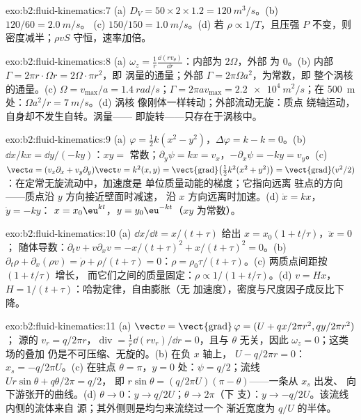 \begin{solution}{exo:b2:fluid-kinematics:7}
(a) $D_V = 50 \times 2 \times 1.2 = \qty{120}{m^3/s}$。(b) $120/60 = \qty{2.0}{m/s}$。
(c) $150/150 = \qty{1.0}{m/s}$。(d) 若 $\rho \propto 1/T$，且压强 $P$ 不变，则
密度减半；$\rho vS$ 守恒，速率加倍。
\end{solution}

\begin{solution}{exo:b2:fluid-kinematics:8}
(a) $\omega_z = \frac1r\frac{\dd(rv_\theta)}{\dd r}$：内部为 $2\Omega$，外部
为 $0$。(b) 内部 $\Gamma = 2\pi r\cdot\Omega r = 2\Omega\cdot\pi r^2$，即
涡量的通量；外部 $\Gamma = 2\pi\Omega a^2$，为常数，即
整个涡核的通量。(c) $\Omega = v_{\max}/a = \qty{1.4}{rad/s}$；$\Gamma = 2\pi av_{\max}
= \qty{2.2e4}{m^2/s}$；在 \qty{500}{m} 处：$\Omega a^2/r = \qty{7}{m/s}$。(d) 涡核
像刚体一样转动；外部流动无旋：质点
绕轴运动，自身却不发生自转。涡量——
即旋转——只存在于涡核中。
\end{solution}

\begin{solution}{exo:b2:fluid-kinematics:9}
(a) $\varphi = \tfrac12k(x^2 - y^2)$，$\Delta\varphi = k - k = 0$。(b) $\dd x/
kx = \dd y/(-ky)$：$xy = $ 常数；$\partial_y\psi = kx = v_x$，$-\partial_x\psi =
-ky = v_y$。(c) $\vect a = (v_x\partial_x + v_y\partial_y)\vect v = k^2(x, y) =
\operatorname{\vect{grad}}\bigl(\tfrac12k^2(x^2 + y^2)\bigr) = \operatorname{\vect{grad}}
(v^2/2)$：在定常无旋流动中，加速度是
单位质量动能的梯度；它指向远离
驻点的方向——质点沿 $y$ 方向接近壁面时减速，
沿 $x$ 方向远离时加速。(d) $\dot x = kx$，$\dot y = -ky$：
$x = x_0\eu^{kt}$，$y = y_0\eu^{-kt}$（$xy$ 为常数）。
\end{solution}

\begin{solution}{exo:b2:fluid-kinematics:10}
(a) $\dd x/\dd t = x/(t + \tau)$ 给出 $x = x_0(1 + t/\tau)$，$\ddot x = 0$；
随体导数：$\partial_tv + v\partial_xv = -x/(t + \tau)^2 + x/(t + \tau)^2
= 0$。(b) $\partial_t\rho + \partial_x(\rho v) = \dot\rho + \rho/(t + \tau) = 0$：$\rho =
\rho_0\tau/(t + \tau)$。(c) 两质点间距按 $(1 + t/\tau)$ 增长，
而它们之间的质量固定：$\rho \propto 1/(1 + t/\tau)$。(d) $v =
Hx$，$H = 1/(t + \tau)$：哈勃定律，自由膨胀（无
加速度），密度与尺度因子成反比下降。
\end{solution}

\begin{solution}{exo:b2:fluid-kinematics:11}
(a) $\vect v = \operatorname{\vect{grad}}\varphi = (U + qx/2\pi r^2, qy/2\pi r^2)$；
源的 $v_r = q/2\pi r$，$\operatorname{div} = \frac1r\dd(rv_r)/\dd r
= 0$，且与 $\theta$ 无关，因此 $\omega_z = 0$；这类场的叠加
仍是不可压缩、无旋的。(b) 在负 $x$ 轴上，
$U - q/2\pi r = 0$：$x_s = -q/2\pi U$。(c) 在驻点 $\theta =
\pi$，$y = 0$ 处：$\psi = q/2$；流线 $Ur\sin\theta + q\theta/2\pi = q/2$，
即 $r\sin\theta = (q/2\pi U)(\pi - \theta)$——一条从 $x_s$ 出发、
向下游张开的曲线。(d) $\theta \to 0$：$y \to q/2U$；$\theta \to 2\pi$（下
支）：$y \to -q/2U$。该流线内侧的流体来自
源；其外侧则是均匀来流绕过一个
渐近宽度为 $q/U$ 的半体。
\end{solution}

